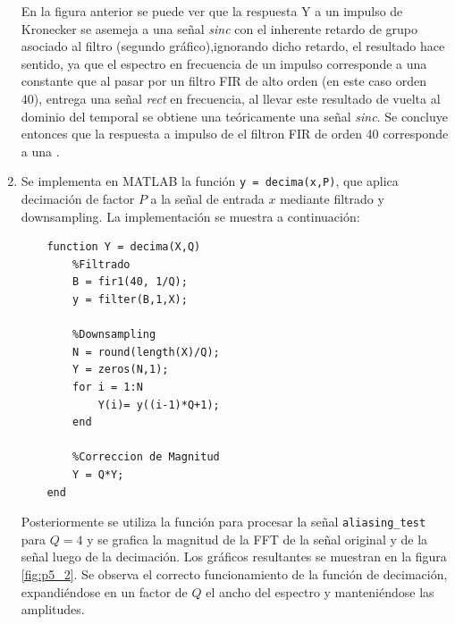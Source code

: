 \begin{enumerate}
En la figura anterior se puede ver que la respuesta Y a un impulso de Kronecker se asemeja a una señal \textit{sinc} con el inherente retardo de grupo asociado al filtro (segundo gráfico),ignorando dicho retardo, el resultado  hace sentido, ya que el espectro en frecuencia de un impulso corresponde a una constante que al pasar por un filtro FIR de alto orden (en este caso orden 40), entrega una señal \textit{rect} en frecuencia, al llevar este resultado de vuelta al dominio del temporal se obtiene una teóricamente una señal \textit{sinc}. Se concluye entonces que la respuesta a impulso de  el filtron FIR de orden 40 corresponde a una .
    
    
    
    
    
\item Se implementa en MATLAB la  función \texttt{y = decima(x,P)}, que  aplica decimación de factor $P$ a la señal de entrada $x$ mediante filtrado y downsampling. La implementación se muestra a continuación:
    
    \begin{lstlisting}
    function Y = decima(X,Q)
        %Filtrado
        B = fir1(40, 1/Q);
        y = filter(B,1,X);        
    
        %Downsampling
        N = round(length(X)/Q);
        Y = zeros(N,1);
        for i = 1:N
            Y(i)= y((i-1)*Q+1);
        end
    
        %Correccion de Magnitud    
        Y = Q*Y;
    end
    \end{lstlisting}

Posteriormente se utiliza la función para procesar la señal \texttt{aliasing\_test} para $Q = 4$ y se grafica la magnitud de la FFT de la señal original y de la señal luego de la decimación. Los gráficos resultantes se muestran en la figura \ref{fig:p5_2}. Se observa el correcto funcionamiento de la función de decimación,  expandiéndose en un factor de $Q$ el ancho del espectro y manteniéndose las amplitudes. 


\end{enumerate}
